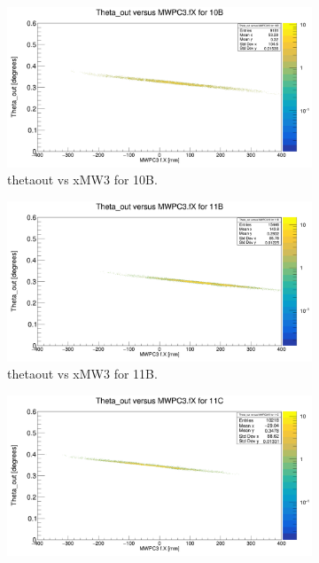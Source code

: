 \documentclass[12pt, letterpaper]{article}
\begin{document}
\begin{figure}[!htbp]
\begin{subfigure}{.5\textwidth}
  \centering
  \includegraphics[width=.9\linewidth]{theta_out_fit10B.png}  
  \caption{theta\textunderscore out vs xMW3 for 10B.}
  \label{fig:sub-first}
\end{subfigure}
\begin{subfigure}{.5\textwidth}
  \centering
  \includegraphics[width=.9\linewidth]{theta_out_fit11B.png} 
  \caption{theta\textunderscore out vs xMW3 for 11B.}
  \label{fig:sub-second}
\end{subfigure}
\begin{subfigure}{.5\textwidth}
  \centering
  \includegraphics[width=.9\linewidth]{theta_out_fit11C.png} 

\end{subfigure}
\end{figure}
\end{document}
